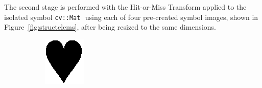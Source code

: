 \documentclass[a4paper,12pt,notitlepage]{article}
\newcommand{\code}[1]{\colorbox{white}{\lstinline[basicstyle=\ttfamily\color{black}]|#1|} }
\begin{document}
		The second stage is performed with the Hit-or-Miss Transform applied to the isolated symbol \code{cv::Mat} using each of four pre-created symbol images, shown in Figure~\ref{fig:structelems}, after being resized to the same dimensions.

		\begin{figure}[H]
			\centering
			\begin{subfigure}[b]{0.15\textwidth}
				\centering
				\includegraphics[width=\textwidth]{chris/image28}
				\caption{}
			\end{subfigure}
			\begin{subfigure}[b]{0.15\textwidth}
				\centering

\end{subfigure}
\end{figure}
\end{document}
